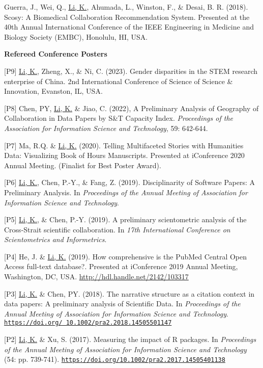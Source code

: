 \documentclass[margin, 10pt]{res} %
\begin{document}
\begin{resume}
[S1] Guerra, J., Wei, Q., \underline{Li, K.}, Ahumada, L., Winston, F., \& Desai, B. R. (2018). Scosy: A Biomedical Collaboration Recommendation System. Presented at the 40th Annual International Conference of the IEEE Engineering in Medicine and Biology Society (EMBC), Honolulu, HI, USA.

\textbf{Refereed Conference Posters}

[P9] \underline{Li, K.}, Zheng, X., & Ni, C. (2023). Gender disparities in the STEM research enterprise of China. 2nd International Conference of Science of Science & Innovation, Evanston, IL, USA.

[P8] Chen, PY, \underline{Li, K.} \& Jiao, C. (2022), A Preliminary Analysis of Geography of Collaboration in Data Papers by S\&T Capacity Index. \textit{Proceedings of the Association for Information Science and Technology}, 59: 642-644.

[P7] Ma, R.Q. \& \underline{Li, K.} (2020). Telling Multifaceted Stories with Humanities Data: Visualizing Book of Hours Manuscripts. Presented at iConference 2020 Annual Meeting. (Finalist for Best Poster Award).

[P6] \underline{Li, K.}, Chen, P.-Y., \& Fang, Z. (2019). Disciplinarity of Software Papers: A Preliminary Analysis. In \textit{Proceedings of the Annual Meeting of Association for Information Science and Technology}.

[P5] \underline{Li, K.}, \& Chen, P.-Y. (2019). A preliminary scientometric analysis of the Cross-Strait scientific collaboration. In \textit{17th International Conference on Scientometrics and Informetrics}.

[P4] He, J. \& \underline{Li, K.} (2019). How comprehensive is the PubMed Central Open Access full-text database?. Presented at iConference 2019 Annual Meeting, Washington, DC, USA. \href{http://hdl.handle.net/2142/103317}{http://hdl.handle.net/2142/103317}

[P3] \underline{Li, K.} \& Chen, PY. (2018). The narrative structure as a citation context in data papers: A preliminary analysis of Scientific Data. In \textit{Proceedings of the Annual Meeting of Association for Information Science and Technology}. \href{https://doi.org/10.1002/pra2.2018.14505501147}{\nolinkurl{https://doi.org/ 10.1002/pra2.2018.14505501147}}

[P2] \underline{Li, K.} \& Xu, S. (2017). Measuring the impact of R packages. In \textit{Proceedings of the Annual Meeting of Association for Information Science and Technology} (54: pp. 739-741). \href{https://doi.org/10.1002/pra2.2017.14505401138}{\nolinkurl{https://doi.org/10.1002/pra2.2017.14505401138}}


\end{resume}
\end{document}

